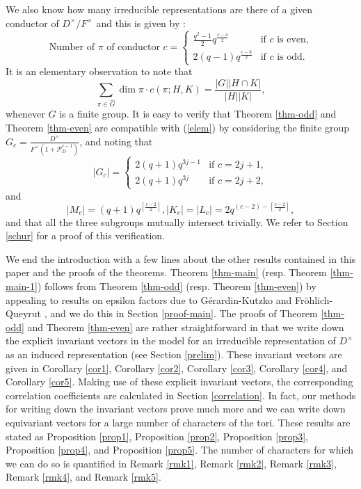 \documentclass[12pt]{amsart}
\theoremstyle{definition}
\theoremstyle{remark}
\begin{document}
We also know how many irreducible representations are there of a given conductor of $D^\times/F^\times$ and this is given by \cite[Proposition 3.5 and Remark on p. 189]{tun78}:
\[\mbox{Number of~} \pi \mbox{~of conductor~} c = \begin{cases}
\frac{q^2-1}{2}q^{\frac{c-4}{2}} &\text{if $c$ is even,} \\
2(q-1)q^{\frac{c-3}{2}} &\text{if $c$ is odd.}
\end{cases}\]
It is an elementary observation to note that \cite[Lemma 2.1]{aj22}
\begin{equation}\label{elem}
\sum_{\pi \in \widehat{G}} \dim \pi \cdot c(\pi;H,K) = \frac{|G||H \cap K|}{|H||K|},
\end{equation}
whenever $G$ is a finite group. It is easy to verify that Theorem \ref{thm-odd} and Theorem \ref{thm-even} are compatible with (\ref{elem}) by considering the finite group $G_c = \frac{D^\times}{F^\times(1+\mathcal P_D^{c-1})}$, and noting that
\[|G_c| = \begin{cases}
2(q+1)q^{3j-1} &\text{if $c=2j+1$,} \\
2(q+1)q^{3j} &\text{if $c=2j+2$},
\end{cases}\]
and 
\[|M_c| = (q+1)q^{\left[\frac{c-2}{2} \right]}, |K_c|=|L_c| = 2q^{(c-2)-\left[\frac{c-2}{2}\right]}, \]
and that all the three subgroups mutually intersect trivially. We refer to Section \ref{schur} for a proof of this verification.

We end the introduction with a few lines about the other results contained in this paper and the proofs of the theorems. Theorem \ref{thm-main} (resp. Theorem \ref{thm-main-1}) follows from Theorem \ref{thm-odd} (resp. Theorem \ref{thm-even}) by appealing to results on epsilon factors due to G\'erardin-Kutzko \cite{gk80} and Fr\"ohlich-Queyrut \cite{fq73}, and we do this in Section \ref{proof-main}. The proofs of Theorem \ref{thm-odd} and Theorem \ref{thm-even} are rather straightforward in that we write down the explicit invariant vectors in the model for an irreducible representation of $D^\times$ as an induced representation (see Section \ref{prelim}). These invariant vectors are given in Corollary \ref{cor1}, Corollary \ref{cor2}, Corollary \ref{cor3}, Corollary \ref{cor4}, and Corollary \ref{cor5}. Making use of these explicit invariant vectors, the corresponding correlation coefficients are calculated in Section \ref{correlation}. In fact, our methods for writing down the invariant vectors prove much more and we can write down equivariant vectors for a large number of characters of the tori. These results are stated as Proposition \ref{prop1}, Proposition \ref{prop2}, Proposition \ref{prop3}, Proposition \ref{prop4}, and Proposition \ref{prop5}. The number of characters for which we can do so is quantified in Remark \ref{rmk1}, Remark \ref{rmk2}, Remark \ref{rmk3}, Remark \ref{rmk4}, and Remark \ref{rmk5}.    
\end{document}
